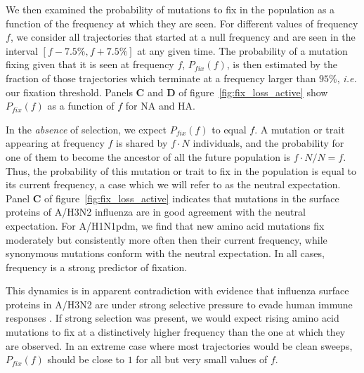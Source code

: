 \documentclass[reprint,amsmath,amssymb,superscriptaddress,showpacs,rmp]{revtex4-1}
\begin{document}
We then examined the probability of mutations to fix in the population as a function of the frequency at which they are seen.
For different values of frequency $f$, we consider all trajectories that started at a null frequency and are seen in the interval $[f - 7.5\%, f + 7.5\%]$ at any given time.
The probability of a mutation fixing given that it is seen at frequency $f$, $P_{fix}(f)$, is then estimated by the fraction of those trajectories which terminate at a frequency larger than $95\%$, \emph{i.e.} our fixation threshold.
Panels \textbf{C} and \textbf{D} of figure~\ref{fig:fix_loss_active} show $P_{fix}(f)$ as a function of $f$ for NA and HA.

In the \emph{absence} of selection, we expect $P_{fix}(f)$ to equal $f$.
A mutation or trait appearing at frequency $f$ is shared by $f\cdot N$ individuals, and the probability for one of them to become the ancestor of all the future population is $f\cdot N/N=f$.
Thus, the probability of this mutation or trait to fix in the population is equal to its current frequency, a case which we will refer to as the neutral expectation.
Panel \textbf{C} of figure~\ref{fig:fix_loss_active} indicates that mutations in the surface proteins of A/H3N2 influenza are in good agreement with the neutral expectation.
For A/H1N1pdm, we find that new amino acid mutations fix moderately but consistently more often then their current frequency, while synonymous mutations conform with the neutral expectation.
In all cases, frequency is a strong predictor of fixation.

This dynamics is in apparent contradiction with evidence that influenza surface proteins in A/H3N2 are under strong selective pressure to evade human immune responses \citep{bhatt_genomic_2011}.
If strong selection was present, we would expect rising amino acid mutations to fix at a distinctively higher frequency than the one at which they are observed.
In an extreme case where most trajectories would be clean sweeps, $P_{fix}(f)$ should be close to $1$ for all but very small values of $f$.
\end{document}
